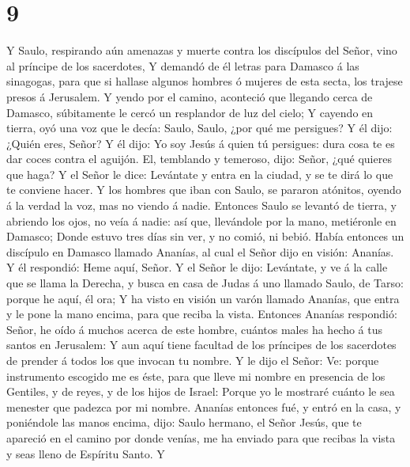 \hypertarget{section-8}{%
\section{9}\label{section-8}}

 Y Saulo, respirando aún amenazas y muerte contra los
discípulos del Señor, vino al príncipe de los sacerdotes, 
Y demandó de él letras para Damasco á las sinagogas, para que si hallase
algunos hombres ó mujeres de esta secta, los trajese presos á Jerusalem.
 Y yendo por el camino, aconteció que llegando cerca de
Damasco, súbitamente le cercó un resplandor de luz del cielo;
 Y cayendo en tierra, oyó una voz que le decía: Saulo,
Saulo, ¿por qué me persigues?  Y él dijo: ¿Quién eres,
Señor? Y él dijo: Yo soy Jesús á quien tú persigues: dura cosa te es dar
coces contra el aguijón.  El, temblando y temeroso, dijo:
Señor, ¿qué quieres que haga? Y el Señor le dice: Levántate y entra en
la ciudad, y se te dirá lo que te conviene hacer.  Y los
hombres que iban con Saulo, se pararon atónitos, oyendo á la verdad la
voz, mas no viendo á nadie.  Entonces Saulo se levantó de
tierra, y abriendo los ojos, no veía á nadie: así que, llevándole por la
mano, metiéronle en Damasco;  Donde estuvo tres días sin
ver, y no comió, ni bebió.  Había entonces un discípulo
en Damasco llamado Ananías, al cual el Señor dijo en visión: Ananías. Y
él respondió: Heme aquí, Señor.  Y el Señor le dijo:
Levántate, y ve á la calle que se llama la Derecha, y busca en casa de
Judas á uno llamado Saulo, de Tarso: porque he aquí, él ora;
 Y ha visto en visión un varón llamado Ananías, que entra
y le pone la mano encima, para que reciba la vista. 
Entonces Ananías respondió: Señor, he oído á muchos acerca de este
hombre, cuántos males ha hecho á tus santos en Jerusalem:
 Y aun aquí tiene facultad de los príncipes de los
sacerdotes de prender á todos los que invocan tu nombre. 
Y le dijo el Señor: Ve: porque instrumento escogido me es éste, para que
lleve mi nombre en presencia de los Gentiles, y de reyes, y de los hijos
de Israel:  Porque yo le mostraré cuánto le sea menester
que padezca por mi nombre.  Ananías entonces fué, y entró
en la casa, y poniéndole las manos encima, dijo: Saulo hermano, el Señor
Jesús, que te apareció en el camino por donde venías, me ha enviado para
que recibas la vista y seas lleno de Espíritu Santo.  Y
